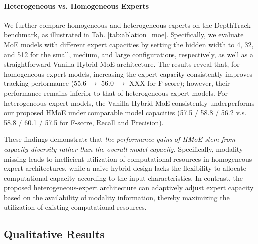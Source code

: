 \paragraph*{Heterogeneous vs. Homogeneous Experts}

We further compare homogeneous and heterogeneous experts on the DepthTrack benchmark, as illustrated in Tab. \ref{tab:ablation_moe}. Specifically, we evaluate MoE models with different expert capacities by setting the hidden width to 4, 32, and 512 for the small, medium, and large configurations, respectively, as well as a straightforward Vanilla Hybrid MoE architecture. The results reveal that, for homogeneous-expert models, increasing the expert capacity consistently improves tracking performance (55.6 $\rightarrow$ 56.0 $\rightarrow$ XXX for F-score); however, their performance remains inferior to that of heterogeneous-expert models. For heterogeneous-expert models, the Vanilla Hybrid MoE consistently underperforms our proposed HMoE under comparable model capacities (57.5 / 58.8 / 56.2 v.s. 58.8 / 60.1 / 57.5 for F-score, Recall and Precision).

These findings demonstrate that \textit{the performance gains of HMoE stem from capacity diversity rather than the overall model capacity.} Specifically, modality missing leads to inefficient utilization of computational resources in homogeneous-expert architectures, while a naive hybrid design lacks the flexibility to allocate computational capacity according to the input characteristics. In contrast, the proposed heterogeneous-expert architecture can adaptively adjust expert capacity based on the availability of modality information, thereby maximizing the utilization of existing computational resources.

\subsection{Qualitative Results}
